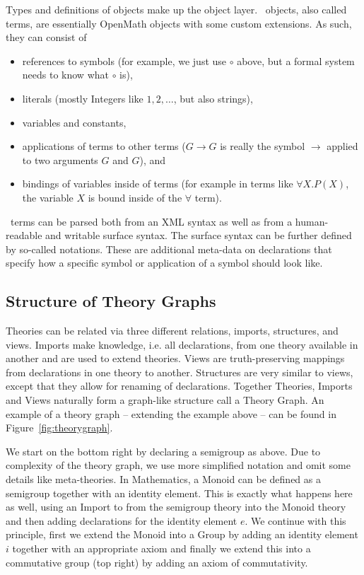 Types and definitions of objects make up the object layer.
\mmt\ objects, also called terms, are essentially OpenMath \cite{BusCapCar:oms04} objects with some custom extensions.
As such, they can consist of 
\begin{itemize}
    \item references to symbols (for example, we just use $\circ$ above, but a formal system needs to know what $\circ$ is), 
    \item literals (mostly Integers like $1, 2, \dots$, but also strings), 
    \item variables and constants, 
    \item applications of terms to other terms ($G \rightarrow G$ is really the symbol $\rightarrow$ applied to two arguments $G$ and $G$), and
    \item bindings of variables inside of terms (for example in terms like $\forall X. P(X)$, the variable $X$ is bound inside of the $\forall$ term). 
\end{itemize}

\mmt\ terms can be parsed both from an XML syntax as well as from a human-readable and writable surface syntax. 
The surface syntax can be further defined by so-called notations. 
These are additional meta-data on declarations that specify how a specific symbol or application of a symbol should look like. 

\subsection{Structure of Theory Graphs}\label{sec:mmt:tg}

Theories can be related via three different relations, imports, structures, and views.
Imports make knowledge, i.e. all declarations, from one theory available in another and are used to extend theories.
Views are truth-preserving mappings from declarations in one theory to another.
Structures are very similar to views, except that they allow for renaming of declarations. 
Together Theories, Imports and Views naturally form a graph-like structure call a Theory Graph.
An example of a theory graph -- extending the example above -- can be found in Figure~\ref{fig:theorygraph}.



We start on the bottom right by declaring a semigroup as above.
Due to complexity of the theory graph, we use more simplified notation and omit some details like meta-theories.
In Mathematics, a Monoid can be defined as a semigroup together with an identity element.
This is exactly what happens here as well, using an Import to from the semigroup theory into the Monoid theory and then adding declarations for the identity element $e$.
We continue with this principle, first we extend the Monoid into a Group by adding an identity element $i$ together with an appropriate axiom and finally we extend this into a commutative group (top right) by adding an axiom of commutativity.

